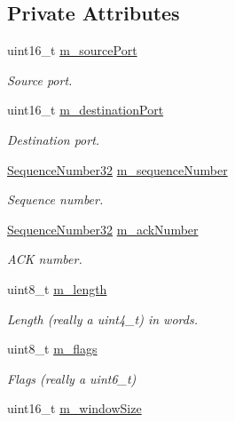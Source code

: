 \subsection*{Private Attributes}
\begin{DoxyCompactItemize}
\item 
uint16\+\_\+t \hyperlink{classns3_1_1TcpHeader_a44bcf51982e1c0bd0c8fd205a28c3927}{m\+\_\+source\+Port}
\begin{DoxyCompactList}\small\item\em Source port. \end{DoxyCompactList}\item 
uint16\+\_\+t \hyperlink{classns3_1_1TcpHeader_aef80cfee978806b00bf64f8154bea90f}{m\+\_\+destination\+Port}
\begin{DoxyCompactList}\small\item\em Destination port. \end{DoxyCompactList}\item 
\hyperlink{group__network_gacb2070e4e98d2d5135c9bede58f07a03}{Sequence\+Number32} \hyperlink{classns3_1_1TcpHeader_aa160a3f86f17511b39b2ec5b95485a9d}{m\+\_\+sequence\+Number}
\begin{DoxyCompactList}\small\item\em Sequence number. \end{DoxyCompactList}\item 
\hyperlink{group__network_gacb2070e4e98d2d5135c9bede58f07a03}{Sequence\+Number32} \hyperlink{classns3_1_1TcpHeader_acee437093aa7817e583ad5f62afc9cca}{m\+\_\+ack\+Number}
\begin{DoxyCompactList}\small\item\em A\+CK number. \end{DoxyCompactList}\item 
uint8\+\_\+t \hyperlink{classns3_1_1TcpHeader_a501531d63af9e3950e137df87fc054da}{m\+\_\+length}
\begin{DoxyCompactList}\small\item\em Length (really a uint4\+\_\+t) in words. \end{DoxyCompactList}\item 
uint8\+\_\+t \hyperlink{classns3_1_1TcpHeader_adf2f1e35446aca125ff4a66527d7974c}{m\+\_\+flags}
\begin{DoxyCompactList}\small\item\em Flags (really a uint6\+\_\+t) \end{DoxyCompactList}\item 
uint16\+\_\+t \hyperlink{classns3_1_1TcpHeader_abbf7aca8f5e3e796525b4b423b4dbf39}{m\+\_\+window\+Size}

\end{DoxyCompactItemize}
